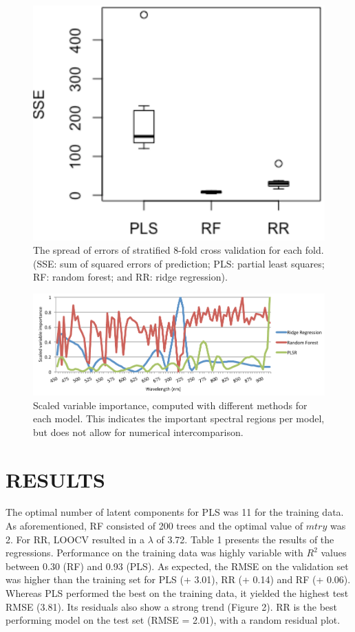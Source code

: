 \documentclass{isprs}
\begin{document}
\begin{figure}[ht!]
\begin{center}
		\includegraphics[width=0.7\columnwidth]{figures/test_sites/fig3.pdf}
	\caption{The spread of errors of stratified 8-fold cross validation for each fold. (SSE: sum of squared errors of prediction; PLS: partial least squares; RF: random forest; and RR: ridge regression).}
\label{fig:figure_placement}
\end{center}
\end{figure}

\begin{figure}
\begin{center}
		\includegraphics[width=1.8\columnwidth]{figures/test_sites/fig4.pdf}
	\caption{Scaled variable importance, computed with different methods for each model. This indicates the important spectral regions per model, but does not allow for numerical intercomparison.}
\label{fig:figure_placement}
\end{center}
\end{figure}

\section{RESULTS}

The optimal number of latent components for PLS was 11 for the training data. As aforementioned, RF consisted of 200 trees and the optimal value of $mtry$ was 2. For RR, LOOCV resulted in a $\lambda$ of 3.72. Table 1 presents the results of the regressions. Performance on the training data was highly variable with $R^2$ values between 0.30 (RF) and 0.93 (PLS). As expected, the RMSE on the validation set was higher than the training set for PLS (+ 3.01), RR (+ 0.14) and RF (+ 0.06). Whereas PLS performed the best on the training data, it yielded the highest test RMSE (3.81). Its residuals also show a strong trend (Figure 2). RR is the best performing model on the test set (RMSE = 2.01), with a random residual plot.
\end{document}
